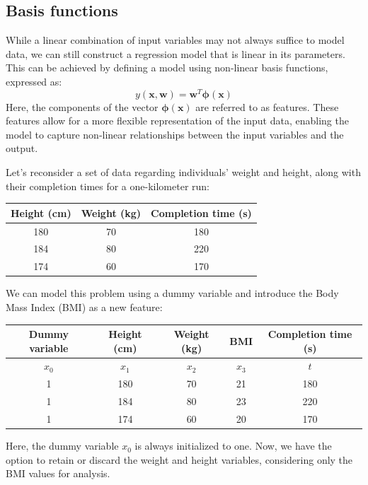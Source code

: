 \subsection{Basis functions}
While a linear combination of input variables may not always suffice to model data, we can still construct a regression model that is linear in its parameters. 
This can be achieved by defining a model using non-linear basis functions, expressed as:
\[y(\mathbf{x},\mathbf{w})=\mathbf{w}^T\boldsymbol{\phi}(\mathbf{x})\]
Here, the components of the vector $\boldsymbol{\phi}(\mathbf{x})$ are referred to as features.
These features allow for a more flexible representation of the input data, enabling the model to capture non-linear relationships between the input variables and the output.
\begin{example}
    Let's reconsider a set of data regarding individuals' weight and height, along with their completion times for a one-kilometer run:
    \begin{table}[H]
        \centering
        \begin{tabular}{c|c|c}
        \textbf{Height (cm)} & \textbf{Weight (kg)} & \textbf{Completion time (s)} \\ \hline
        180                  & 70                   & 180                          \\
        184                  & 80                   & 220                          \\
        174                  & 60                   & 170                         
        \end{tabular}
    \end{table}
    We can model this problem using a dummy variable and introduce the Body Mass Index (BMI) as a new feature:
    \begin{table}[H]
        \centering
        \begin{tabular}{c|c|c|c|c}
        \textbf{Dummy variable} & \textbf{Height (cm)} & \textbf{Weight (kg)} & \textbf{BMI} & \textbf{Completion time (s)} \\ \hline
        $x_0$                   & $x_1$                & $x_2$                & $x_3$        & $t$                          \\
        1                       & 180                  & 70                   & 21           & 180                          \\
        1                       & 184                  & 80                   & 23           & 220                          \\
        1                       & 174                  & 60                   & 20           & 170                         
        \end{tabular}
    \end{table}
    Here, the dummy variable $x_0$ is always initialized to one.
    Now, we have the option to retain or discard the weight and height variables, considering only the BMI values for analysis.
\end{example}
